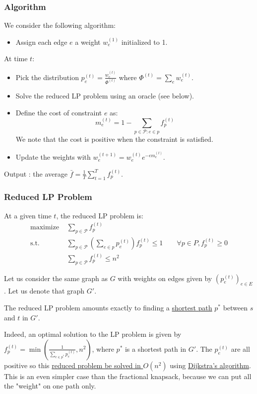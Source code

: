 \documentclass[a4paper, 11pt]{article}
\begin{document}
\subsubsection*{Algorithm}

We consider the following algorithm:

\begin{itemize}
    \item Assign each edge $e$ a weight $w_e^{(1)}$ initialized to 1.
\end{itemize}
At time $t$: %
\begin{itemize}
    \item Pick the distribution $p_e^{(t)} = \frac{w_e^{(t)}}{\Phi^{(t)}}$ where $\Phi^{(t)} = \sum_{e} w_e^{(t)}$.
    \item Solve the reduced LP problem using an oracle (see below).
    \item Define the cost of constraint $e$ as:
        $$\boxed{m_e^{(t)} = 1 - \sum_{p\in\mathcal{P} : e \in p} f_p^{(t)}}$$
        We note that the cost is positive when the constraint is satisfied.
    \item Update the weights with $w_e^{(t+1)} = w_e^{(t)} e^{-\epsilon m_e^{(t)}}$.
\end{itemize}

Output : the average $\bar{f} = \frac{1}{T}\sum_{t = 1}^{T}f_p^{(t)}$.

\subsubsection*{Reduced LP Problem}

At a given time $t$, the reduced LP problem is:
\begin{align*}
    \text{maximize }&\sum_{p \in \mathcal{P}} f_p^{(t)} \\
    \text{s.t. }&\sum_{p \in \mathcal{P}} \left(\sum_{e \in p} p_e^{(t)}\right)f_p^{(t)} \le 1 \qquad
\forall p \in P, f_p^{(t)} \ge 0 \\
    &\sum_{p \in \mathcal{P}}f_p^{(t)} \le n^2
\end{align*}

Let us consider the same graph as $G$ with weights on edges given by $(p_e^{(t)})_{e\in E}$. Let us denote that graph $G'$.

The reduced LP problem amounts exactly to finding a \ul{shortest path} $p^*$ between $s$ and $t$ in $G'$.

Indeed, an optimal solution to the LP problem is given by $f_{p}^{(t)} = \min\left(\frac{1}{\sum_{e \in p^*} p_e^{(t)}}, n^2\right)$, where $p^*$ is a shortest path in $G'$. The $p_e^{(t)}$ are all positive so this \ul{reduced problem be solved in $O(n^2)$} using \ul{Dijkstra's algorithm}. This is an even simpler case than the fractional knapsack, because we can put all the "weight" on one path only.
\end{document}

